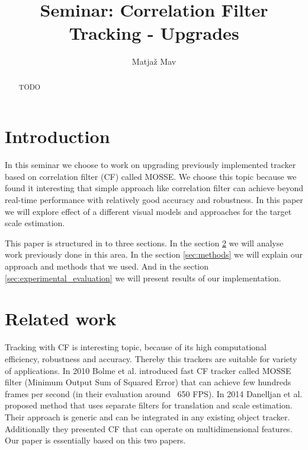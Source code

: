 \documentclass[runningheads]{llncs}
\begin{document}
% 
\title{Seminar: Correlation Filter Tracking - Upgrades}
\author{Matjaž Mav}
%
\maketitle
%
 
\begin{abstract}
TODO
\end{abstract}

\section{Introduction}
In this seminar we choose to work on upgrading previously implemented tracker based on correlation filter (CF) called MOSSE. We choose this topic because we found it interesting that simple approach like correlation filter can achieve beyond real-time performance with relatively good accuracy and robustness. In this paper we will explore effect of a different visual models and approaches for the target scale estimation.

This paper is structured in to three sections. In the section \ref{sec:related_work} we will analyse work previously done in this area. In the section \ref{sec:methods} we will explain our approach and methods that we used. And in the section \ref{sec:experimental_evaluation} we will present results of our implementation.

\section{Related work}
\label{sec:related_work}
Tracking with CF is interesting topic, because of its high computational efficiency, robustness and accuracy. Thereby this trackers are suitable for variety of applications. In 2010 Bolme et al. \cite{bolme2010visual} introduced fast CF tracker called MOSSE filter (Minimum Output Sum of Squared Error) that can achieve few hundreds frames per second (in their evaluation around ~650 FPS).  In 2014 Danelljan et al. \cite{danelljan2014accurate} proposed method that uses separate filters for translation and scale estimation. Their approach is generic and can be integrated in any existing object tracker. Additionally they presented CF that can operate on multidimensional features. Our paper is essentially based on this two papers.
\end{document}
